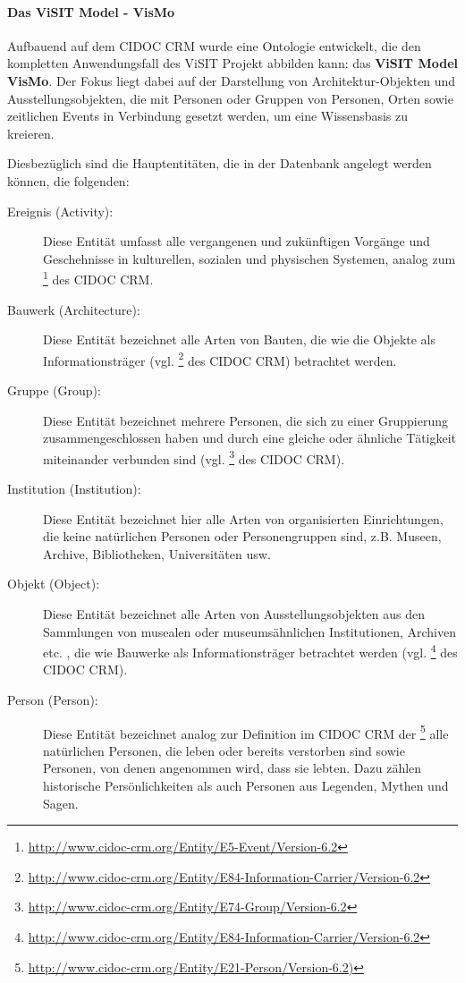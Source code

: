 \paragraph{Das ViSIT Model - VisMo}

Aufbauend auf dem CIDOC CRM wurde eine Ontologie entwickelt, die den kompletten Anwendungsfall des ViSIT Projekt abbilden kann: das \textbf{ViSIT Model VisMo}. Der Fokus liegt dabei auf der Darstellung von Architektur-Objekten und Ausstellungsobjekten, die mit Personen oder Gruppen von Personen, Orten sowie zeitlichen Events in Verbindung gesetzt werden, um eine Wissensbasis zu kreieren.

Diesbezüglich sind die Hauptentitäten, die in der \visit Datenbank angelegt werden können, die folgenden:

\begin{description}
	\item[Ereignis (Activity):] Diese Entität umfasst alle vergangenen und zukünftigen Vorgänge und Geschehnisse in kulturellen, sozialen und physischen Systemen, analog zum \texttt{}\footnote{\url{http://www.cidoc-crm.org/Entity/E5-Event/Version-6.2}} des CIDOC CRM.
	\item[Bauwerk (Architecture):] Diese Entität bezeichnet alle Arten von Bauten, die wie die Objekte als Informationsträger (vgl. \texttt{}\footnote{\url{http://www.cidoc-crm.org/Entity/E84-Information-Carrier/Version-6.2}} des CIDOC CRM) betrachtet werden.
	\item[Gruppe (Group):] Diese Entität bezeichnet mehrere Personen, die sich zu einer Gruppierung zusammengeschlossen haben und durch eine gleiche oder ähnliche Tätigkeit miteinander verbunden sind (vgl. \texttt{}\footnote{\url{http://www.cidoc-crm.org/Entity/E74-Group/Version-6.2}} des CIDOC CRM).
	\item[Institution (Institution):] Diese Entität bezeichnet hier alle Arten von organisierten Einrichtungen, die keine natürlichen Personen oder Personengruppen sind, z.B. Museen, Archive, Bibliotheken, Universitäten usw.
	\item[Objekt (Object):] Diese Entität bezeichnet alle Arten von Ausstellungsobjekten aus den Sammlungen von musealen oder museumsähnlichen Institutionen, Archiven etc. , die wie Bauwerke als Informationsträger betrachtet werden (vgl. \texttt{}\footnote{\url{http://www.cidoc-crm.org/Entity/E84-Information-Carrier/Version-6.2}} des CIDOC CRM).
	\item[Person (Person):] Diese Entität bezeichnet analog zur Definition im CIDOC CRM der \texttt{}\footnote{\url{http://www.cidoc-crm.org/Entity/E21-Person/Version-6.2)}} alle natürlichen Personen, die leben oder bereits verstorben sind sowie Personen, von denen angenommen wird, dass sie lebten. Dazu zählen historische Persönlichkeiten als auch Personen aus Legenden, Mythen und Sagen.

\end{description}
